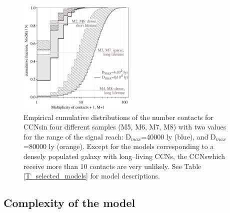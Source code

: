 \documentclass[crop]{CSLB}
\newcommand{\cetis}{CCNs}
\begin{document}
 
\begin{figure} \centering
   \includegraphics[width=0.5\textwidth]{F_number_of_contacts.pdf}
   \caption{
Empirical cumulative distributions of the number contacts
for \cetis in four different samples (M5, M6, M7, M8) with two
values for the range of the signal reach: D$_{max}$=40000 ly (blue),  and 
D$_{max}$=80000 ly (orange).
%
Except for the models corresponding to a densely populated galaxy with
long--living \cetis, the \cetis which receive more than 10 contacts
are very unlikely.
%
See Table \ref{T_selected_models} for model descriptions.
%
   } \label{F_number_of_contacts}
\end{figure}
        
 

\subsection{Complexity of the model}
\end{document}
